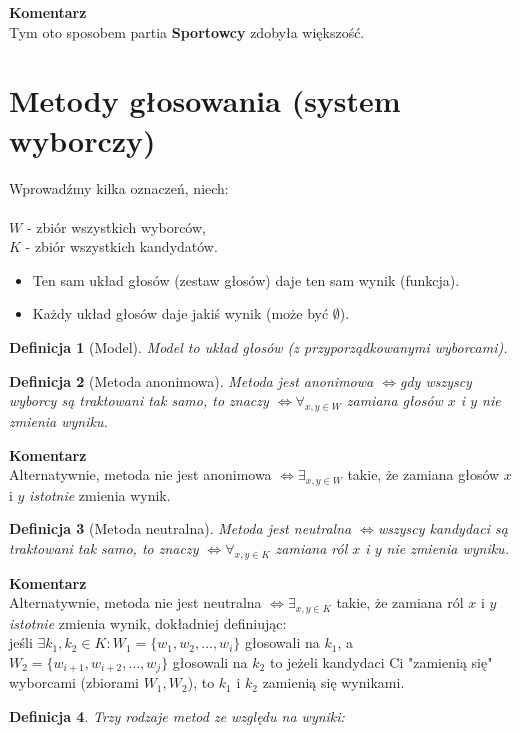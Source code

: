 \documentclass[12pt,a4paper]{article}
\theoremstyle{break}
\newcommand{\Komentarz}[1]{
	\begin{mdframed}[style=zadanie]
		\textbf{Komentarz}\\
		#1
	\end{mdframed}
	}
\newtheorem{definition}{Definicja}[section]
\newcommand{\witw}{$\Leftrightarrow$}
\begin{document}
\Komentarz{Tym oto sposobem partia \textbf{Sportowcy} zdobyła większość.}

	
\newpage

\section{Metody głosowania (system wyborczy)}

Wprowadźmy kilka oznaczeń, niech: \\
\\ $W$ - zbiór wszystkich wyborców, \\
$K$ - zbiór wszystkich kandydatów.
\begin{itemize}
	\item Ten sam układ głosów (zestaw głosów) daje ten sam wynik (funkcja).
	\item Każdy układ głosów daje jakiś wynik (może być $\emptyset$).
\end{itemize}

\begin{definition}[Model]
	Model to układ głosów (z przyporządkowanymi wyborcami).
\end{definition}

\begin{definition}[Metoda anonimowa]
	Metoda jest anonimowa \witw gdy wszyscy wyborcy są traktowani tak samo, to znaczy \witw $\forall_{x,y \in W}$ zamiana głosów $x$ i $y$ nie zmienia wyniku.
\end{definition}

\Komentarz{Alternatywnie, metoda nie jest anonimowa \witw $\exists_{x,y \in W}$ takie, że zamiana głosów $x$ i $y$ \textit{istotnie} zmienia wynik.}

\begin{definition}[Metoda neutralna]
	Metoda jest neutralna \witw wszyscy kandydaci są traktowani tak samo, to znaczy \witw $\forall_{x,y \in K}$ zamiana ról $x$ i $y$ nie zmienia wyniku.
\end{definition}

\Komentarz{Alternatywnie, metoda nie jest neutralna \witw $\exists_{x,y \in K}$ takie, że zamiana ról $x$ i $y$ \textit{istotnie} zmienia wynik, dokładniej definiując:\\
jeśli $\exists{k_1,k_2\in K}: W_1=\{w_{1},w_{2},\dots,w_{i}\}$ głosowali na $k_1$, a $W_2=\{w_{i+1},w_{i+2},\dots,w_{j}\}$ głosowali na $k_2$ to jeżeli kandydaci Ci "zamienią się" wyborcami (zbiorami $W_1,W_2$), to $k_1$ i $k_2$ zamienią się wynikami.}

\begin{definition}
	Trzy rodzaje metod ze względu na wyniki:
\end{definition}
\end{document}
